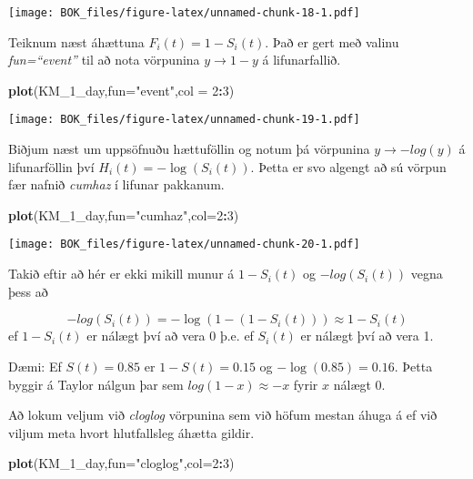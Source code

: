 \documentclass[
]{book}
\newenvironment{Shaded}{\begin{snugshade}}{\end{snugshade}}
\newcommand{\DataTypeTok}[1]{\textcolor[rgb]{0.13,0.29,0.53}{#1}}
\newcommand{\DecValTok}[1]{\textcolor[rgb]{0.00,0.00,0.81}{#1}}
\newcommand{\KeywordTok}[1]{\textcolor[rgb]{0.13,0.29,0.53}{\textbf{#1}}}
\newcommand{\NormalTok}[1]{#1}
\newcommand{\OperatorTok}[1]{\textcolor[rgb]{0.81,0.36,0.00}{\textbf{#1}}}
\newcommand{\StringTok}[1]{\textcolor[rgb]{0.31,0.60,0.02}{#1}}
\begin{document}
\texttt{[image: BOK\_files/figure-latex/unnamed-chunk-18-1.pdf]}

Teiknum næst áhættuna \(F_i(t)=1-S_i(t)\). Það er gert með valinu \emph{fun=``event''} til að nota vörpunina \(y \to 1-y\) á lifunarfallið.

\begin{Shaded}
\begin{Highlighting}[]
\KeywordTok{plot}\NormalTok{(KM\_}\DecValTok{1}\NormalTok{\_day,}\DataTypeTok{fun=}\StringTok{"event"}\NormalTok{,}\DataTypeTok{col =} \DecValTok{2}\OperatorTok{:}\DecValTok{3}\NormalTok{)}
\end{Highlighting}
\end{Shaded}

\texttt{[image: BOK\_files/figure-latex/unnamed-chunk-19-1.pdf]}

Biðjum næst um uppsöfnuðu hættuföllin og notum þá vörpunina \(y \to -log(y)\) á lifunarföllin því \(H_i(t) = -\log(S_i(t))\). Þetta er svo algengt að sú vörpun fær nafnið \emph{cumhaz} í lifunar pakkanum.

\begin{Shaded}
\begin{Highlighting}[]
\KeywordTok{plot}\NormalTok{(KM\_}\DecValTok{1}\NormalTok{\_day,}\DataTypeTok{fun=}\StringTok{"cumhaz"}\NormalTok{,}\DataTypeTok{col=}\DecValTok{2}\OperatorTok{:}\DecValTok{3}\NormalTok{)}
\end{Highlighting}
\end{Shaded}

\texttt{[image: BOK\_files/figure-latex/unnamed-chunk-20-1.pdf]}

Takið eftir að hér er ekki mikill munur á \(1-S_i(t)\) og \(-log(S_i(t))\) vegna þess að

\[
-log(S_i(t))=-\log(1-(1-S_i(t))) \approx 1-S_i(t)
\]
ef \(1-S_i(t)\) er nálægt því að vera 0 þ.e. ef \(S_i(t)\) er nálægt því að vera 1.

Dæmi: Ef \(S(t)=0.85\) er \(1-S(t)=0.15\) og \(-\log(0.85)=0.16\). Þetta byggir á Taylor nálgun þar sem \(log(1-x) \approx -x\) fyrir \(x\) nálægt 0.

Að lokum veljum við \emph{cloglog} vörpunina sem við höfum mestan áhuga á ef við viljum meta hvort hlutfallsleg áhætta gildir.

\begin{Shaded}
\begin{Highlighting}[]
\KeywordTok{plot}\NormalTok{(KM\_}\DecValTok{1}\NormalTok{\_day,}\DataTypeTok{fun=}\StringTok{"cloglog"}\NormalTok{,}\DataTypeTok{col=}\DecValTok{2}\OperatorTok{:}\DecValTok{3}\NormalTok{)}
\end{Highlighting}
\end{Shaded}
\end{document}

